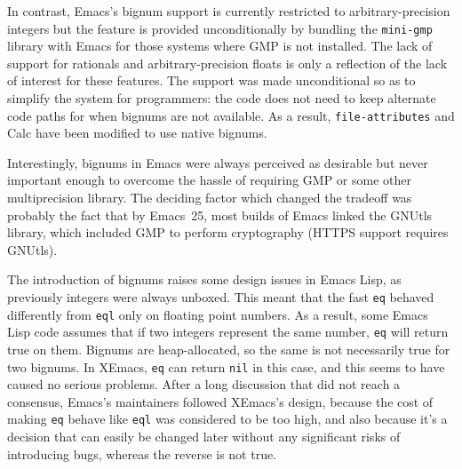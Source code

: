 \documentclass[format=acmsmall,screen]{acmart}
\newcommand \Elisp {Emacs Lisp}
\begin{document}
In contrast, Emacs's bignum support is currently restricted to
arbitrary-precision integers but the feature is provided unconditionally by
bundling the \texttt{mini-gmp} library with Emacs for those systems where
GMP is not installed.  The lack of support for rationals and
arbitrary-precision floats is only a reflection of the lack of interest for
these features.  The support was made unconditional so as to simplify the
system for programmers: the code does
not need to keep alternate code paths for when bignums are not available.
As a result, \texttt{file-attributes} and Calc have been modified to use
native bignums.

Interestingly, bignums in Emacs were always perceived as desirable but never
important enough to overcome the hassle of requiring GMP or some other
multiprecision library.  The deciding factor which changed the tradeoff was probably the fact that by Emacs~25, most builds of Emacs linked the GNUtls
library, which included GMP to perform cryptography (HTTPS support requires GNUtls).

The introduction of bignums raises some design issues in \Elisp, as
previously integers were always unboxed.  This meant that the fast
\texttt{eq} behaved differently from \texttt{eql} only on floating point
numbers.  As a result, some \Elisp{} code assumes that if two integers
represent the same number, \texttt{eq} will return true on them.
Bignums are heap-allocated, so the same is not necessarily true for two
bignums.  In XEmacs, \texttt{eq} can return \texttt{nil} in this case, and
this seems to have caused no serious problems.  After a long discussion that
did not reach a consensus, Emacs's maintainers followed XEmacs's design,
because the cost of making \texttt{eq} behave like \texttt{eql} was
considered to be too high, and also because it's a decision that can easily
be changed later without any significant risks of introducing bugs, whereas
the reverse is not true.




\end{document}
